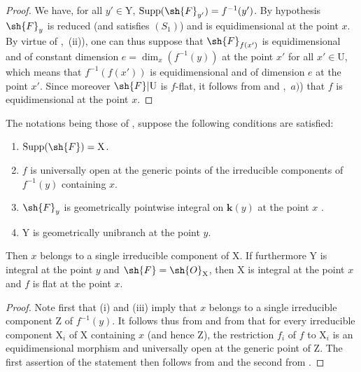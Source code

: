 \begin{proof}
\label{IV.15.3.2-proof}
We have, for all $y'\in\mathrm{Y}$, $\operatorname{Supp}(\sh{F}_{y'})=f^{-1}(y')$.
By hypothesis $\sh{F}_y$ is reduced (and satisfies $(S_1)$) and is equidimensional at the point $x$.
By virtue of ,~(ii)), one can thus suppose that $\sh{F}_{f(x')}$ is equidimensional and of constant dimension $e=\dim_x(f^{-1}(y))$ at the point $x'$ for all $x'\in\mathrm{U}$, which means that $f^{-1}(f(x'))$ is equidimensional and of dimension $e$ at the point $x'$.
Since moreover $\sh{F}|\mathrm{U}$ is $f$-flat, it follows from  and ,~$a)$) that $f$ is equidimensional at the point $x$.
\end{proof}

\begin{corollary}[15.3.3]
\label{IV.15.3.3}
The notations being those of , suppose the following conditions are satisfied:
\begin{enumerate}[label=(\roman*)]
  \item $\operatorname{Supp}(\sh{F})=\mathrm{X}$.
  \item $f$ is universally open at the generic points of the irreducible components of $f^{-1}(y)$ containing $x$.
  \item $\sh{F}_y$ is geometrically pointwise integral on $\mathbf{k}(y)$ at the point $x$ .
  \item $\mathrm{Y}$ is geometrically unibranch at the point $y$.
\end{enumerate}
Then $x$ belongs to a single irreducible component of $\mathrm{X}$.
If furthermore $\mathrm{Y}$ is integral at the point $y$ and $\sh{F}=\sh{O}_\mathrm{X}$, then $\mathrm{X}$ is integral at the point $x$ and $f$ is flat at the point $x$.
\end{corollary}

\begin{proof}
\label{IV.15.3.3-proof}
Note first that (i) and (iii) imply that $x$ belongs to a single irreducible component $\mathrm{Z}$ of $f^{-1}(y)$.
It follows thus from  and from  that for every irreducible component $\mathrm{X}_i$ of $\mathrm{X}$ containing $x$ (and hence $\mathrm{Z}$), the restriction $f_i$ of $f$ to $\mathrm{X}_i$ is an equidimensional morphism and universally open at the generic point of $\mathrm{Z}$.
The first assertion of the statement then follows from  and the second from .
\end{proof}

